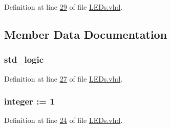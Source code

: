 Definition at line \hyperlink{_l_e_ds_8vhd_source_l00029}{29} of file \hyperlink{_l_e_ds_8vhd_source}{L\+E\+Ds.\+vhd}.



\subsection{Member Data Documentation}
\hypertarget{class_l_e_ds_1_1_l_e_ds_a15ab33796b0132ed52d27866826e80ef}{}
\subsubsection[{blink}]{ {\bfseries \textcolor{comment}{std\+\_\+logic}\textcolor{vhdlchar}{ }} \hspace{0.3cm}{\ttfamily [Signal]}}\label{class_l_e_ds_1_1_l_e_ds_a15ab33796b0132ed52d27866826e80ef}


Definition at line \hyperlink{_l_e_ds_8vhd_source_l00027}{27} of file \hyperlink{_l_e_ds_8vhd_source}{L\+E\+Ds.\+vhd}.

\hypertarget{class_l_e_ds_1_1_l_e_ds_a1890617960a841a3d027f78733169e15}{}
\subsubsection[{B\+L\+I\+N\+K\+\_\+\+F\+R\+E\+Q}]{ {\bfseries \textcolor{comment}{integer}\textcolor{vhdlchar}{ }\textcolor{vhdlchar}{ }\textcolor{vhdlchar}{\+:}\textcolor{vhdlchar}{=}\textcolor{vhdlchar}{ }\textcolor{vhdlchar}{ } \textcolor{vhdldigit}{1} \textcolor{vhdlchar}{ }} \hspace{0.3cm}{\ttfamily [Constant]}}\label{class_l_e_ds_1_1_l_e_ds_a1890617960a841a3d027f78733169e15}


Definition at line \hyperlink{_l_e_ds_8vhd_source_l00024}{24} of file \hyperlink{_l_e_ds_8vhd_source}{L\+E\+Ds.\+vhd}.

\hypertarget{class_l_e_ds_1_1_l_e_ds_aa45ed8f4ade73b3c1510f9df8ec7dd9c}{}
